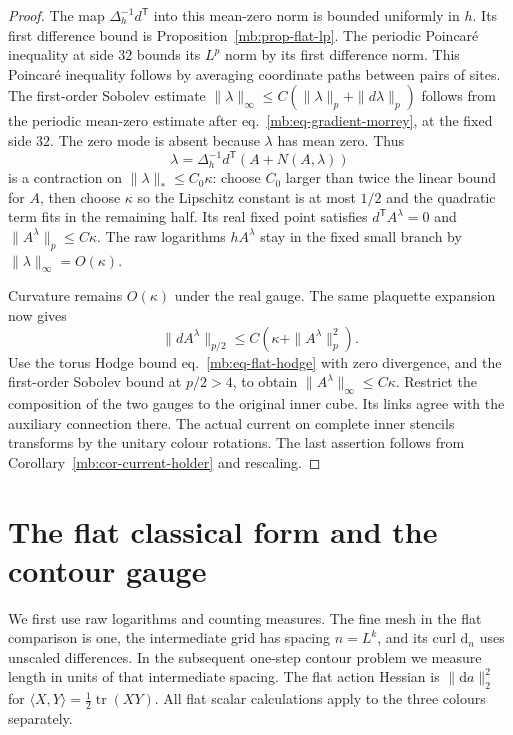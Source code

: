\documentclass[11pt,letterpaper,reqno]{amsart}
\numberwithin{equation}{section}
\renewcommand{\eqref}[1]{\textup{eq.~\ref{#1}}}
\theoremstyle{definition}
\theoremstyle{remark}
\begin{document}
\begin{proof}
The map \(\Delta_h^{-1}d^{\mathsf T}\) into this mean-zero
norm is bounded uniformly in \(h\). Its first difference
bound is Proposition~\ref{mb:prop-flat-lp}. The periodic
Poincar\'e inequality at side \(32\) bounds its \(L^p\)
norm by its first difference norm. This Poincar\'e
inequality follows by averaging coordinate paths between
pairs of sites. The first-order Sobolev estimate
\(\|\lambda\|_\infty\le C(\|\lambda\|_p+\|d\lambda\|_p)\)
follows from the periodic mean-zero estimate after
\eqref{mb:eq-gradient-morrey}, at the fixed side \(32\).
The zero mode is absent because \(\lambda\) has mean zero.
Thus
\[
 \lambda=\Delta_h^{-1}d^{\mathsf T}
                              (A+N(A,\lambda))
\]
is a contraction on \(\|\lambda\|_*\le C_0\kappa\):
choose \(C_0\) larger than twice the linear bound
for \(A\), then choose \(\kappa\) so the Lipschitz
constant is at most \(1/2\) and the quadratic term
fits in the remaining half. Its real fixed point
satisfies \(d^{\mathsf T}A^\lambda=0\) and
\(\|A^\lambda\|_p\le C\kappa\).
The raw logarithms \(hA^\lambda\) stay in the fixed
small branch by \(\|\lambda\|_\infty=O(\kappa)\).

Curvature remains \(O(\kappa)\) under the real gauge.
The same plaquette expansion now gives
\[
 \|dA^\lambda\|_{p/2}\le C(\kappa+\|A^\lambda\|_p^2).
\]
Use the torus Hodge bound \eqref{mb:eq-flat-hodge}
with zero divergence, and the first-order Sobolev
bound at \(p/2>4\), to obtain
\(\|A^\lambda\|_\infty\le C\kappa\).
Restrict the composition of the two gauges to the
original inner cube. Its links agree with the
auxiliary connection there. The actual current on
complete inner stencils transforms by the unitary
colour rotations. The last assertion follows from
Corollary~\ref{mb:cor-current-holder} and rescaling.
\end{proof}


\section{The flat classical form and the contour gauge}\label{mb:sec-flat-contour}

We first use raw logarithms and counting measures. The fine
mesh in the flat comparison is one, the intermediate grid has
spacing \(n=L^k\), and its curl \(\mathrm d_n\) uses unscaled
differences. In the subsequent one-step contour problem we measure
length in units of that intermediate spacing. The flat action
Hessian is \(\|\mathrm da\|_2^2\) for
\(\langle X,Y\rangle=\tfrac12\operatorname{tr}(XY)\). All
flat scalar calculations apply to the three colours separately.
\end{document}

